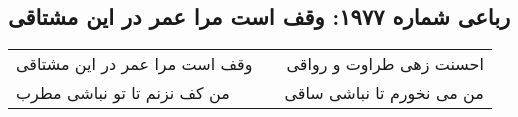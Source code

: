 \begin{center}
\section*{رباعی شماره ۱۹۷۷: وقف است مرا عمر در این مشتاقی}
\label{sec:1977}
\begin{longtable}{l p{0.5cm} r}
وقف است مرا عمر در این مشتاقی
&&
احسنت زهی طراوت و رواقی
\\
من کف نزنم تا تو نباشی مطرب
&&
من می نخورم تا نباشی ساقی
\\
\end{longtable}
\end{center}

